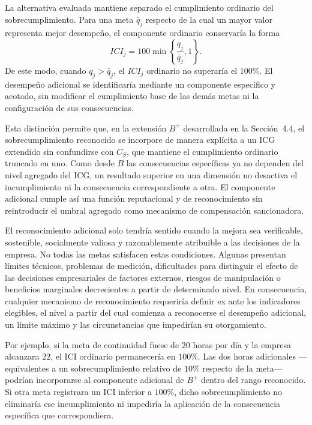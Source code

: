 La alternativa evaluada mantiene separado el cumplimiento ordinario del sobrecumplimiento. Para una meta \(\bar q_j\) respecto de la cual un mayor valor representa mejor desempeño, el componente ordinario conservaría la forma
\begin{equation}
ICI_j
=
100\min\left\{
\frac{q_j}{\bar q_j},1
\right\}.
\end{equation}
De este modo, cuando \(q_j>\bar q_j\), el \(ICI_j\) ordinario no superaría el \(100\%\). El desempeño adicional se identificaría mediante un componente específico y acotado, sin modificar el cumplimiento base de las demás metas ni la configuración de sus consecuencias.

Esta distinción permite que, en la extensión \(B^{+}\) desarrollada en la Sección~4.4, el sobrecumplimiento reconocido se incorpore de manera explícita a un ICG extendido sin confundirse con \(C_S\), que mantiene el cumplimiento ordinario truncado en uno. Como desde \(B\) las consecuencias específicas ya no dependen del nivel agregado del ICG, un resultado superior en una dimensión no desactiva el incumplimiento ni la consecuencia correspondiente a otra. El componente adicional cumple así una función reputacional y de reconocimiento sin reintroducir el umbral agregado como mecanismo de compensación sancionadora.

El reconocimiento adicional solo tendría sentido cuando la mejora sea verificable, sostenible, socialmente valiosa y razonablemente atribuible a las decisiones de la empresa. No todas las metas satisfacen estas condiciones. Algunas presentan límites técnicos, problemas de medición, dificultades para distinguir el efecto de las decisiones empresariales de factores externos, riesgos de manipulación o beneficios marginales decrecientes a partir de determinado nivel. En consecuencia, cualquier mecanismo de reconocimiento requeriría definir ex ante los indicadores elegibles, el nivel a partir del cual comienza a reconocerse el desempeño adicional, un límite máximo y las circunstancias que impedirían su otorgamiento.

Por ejemplo, si la meta de continuidad fuese de \(20\) horas por día y la empresa alcanzara \(22\), el ICI ordinario permanecería en \(100\%\). Las dos horas adicionales ---equivalentes a un sobrecumplimiento relativo de \(10\%\) respecto de la meta--- podrían incorporarse al componente adicional de \(B^{+}\) dentro del rango reconocido. Si otra meta registrara un ICI inferior a \(100\%\), dicho sobrecumplimiento no eliminaría ese incumplimiento ni impediría la aplicación de la consecuencia específica que correspondiera.

